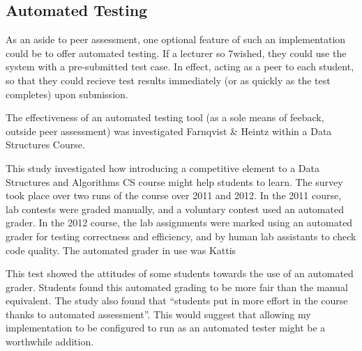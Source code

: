\documentclass[a4paper,11pt]{report}
\begin{document}
\subsection{Automated Testing}
As an aside to peer assessment, one optional feature of such an implementation could be to offer automated testing. If a lecturer so 7wished, they could use the system with a pre-submitted test case. In effect, acting as a peer to each student, so that they could recieve test results immediately (or as quickly as the test completes) upon submission.\par
The effectiveness of an automated testing tool (as a sole means of feeback, outside peer assessment) was investigated Farnqvist \& Heintz \cite{farnqvist_competition_2016} within a Data Structures Course.\par
This study investigated how introducing a competitive element to a Data Structures and Algorithms CS course might help students to learn. The survey took place over two runs of the course over 2011 and 2012. In the 2011 course, lab contests were graded manually, and a voluntary contest used an automated grader. In the 2012 course, the lab assignments were marked using an automated grader for testing correctness and efficiency, and by human lab assistants to check code quality. The automated grader in use was Kattis \cite{enstrom_five_2011}\par
This test showed the attitudes of some students towards the use of an automated grader. Students found this automated grading to be more fair than the manual equivalent. The study also found that ``students put in more effort in the course thanks to automated assessment''. This would suggest that allowing my implementation to be configured to run as an automated tester might be a worthwhile addition.\par
\end{document}
